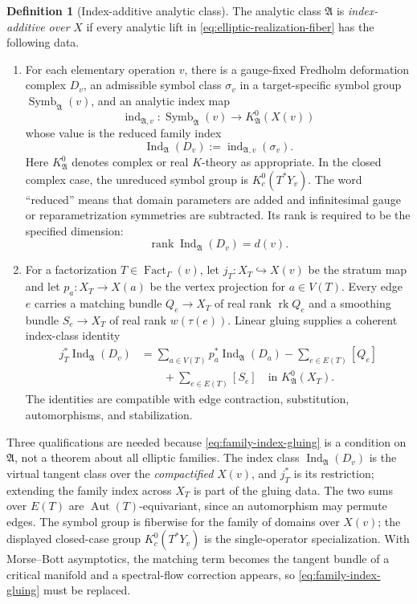 \documentclass[11pt,letterpaper,twoside]{article}
\theoremstyle{plain}
\theoremstyle{definition}
\newtheorem{definition}[theorem]{Definition}
\theoremstyle{remark}
\newcommand{\Ind}{\operatorname{Ind}}
\DeclareMathOperator{\Fact}{Fact}
\begin{document}
\begin{definition}[Index-additive analytic class]\label{def:index-excisive}
The analytic class $\mathfrak A$ is \emph{index-additive over} $X$ if every analytic lift in \eqref{eq:elliptic-realization-fiber} has the following data.
\begin{enumerate}
\item For each elementary operation $v$, there is a gauge-fixed Fredholm deformation complex $D_v$, an admissible symbol class $\sigma_v$ in a target-specific symbol group $\operatorname{Symb}_{\mathfrak A}(v)$, and an analytic index map
\[
 \operatorname{ind}_{\mathfrak A,v}:
 \operatorname{Symb}_{\mathfrak A}(v)
 \longrightarrow K^0_{\mathfrak A}(X(v))
\]
whose value is the reduced family index
\[
 \Ind_{\mathfrak A}(D_v)
 :=\operatorname{ind}_{\mathfrak A,v}(\sigma_v).
\]
Here $K^0_{\mathfrak A}$ denotes complex or real $K$-theory as appropriate.  In the closed complex case, the unreduced symbol group is $K_c^0(T^*Y_v)$.  The word ``reduced'' means that domain parameters are added and infinitesimal gauge or reparametrization symmetries are subtracted.  Its rank is required to be the specified dimension:
\[
 \operatorname{rank}\Ind_{\mathfrak A}(D_v)=d(v).
\]
\item For a factorization $T\in\Fact_\Gamma(v)$, let $j_T:X_T\hookrightarrow X(v)$ be the stratum map and let $p_a:X_T\to X(a)$ be the vertex projection for $a\in V(T)$.  Every edge $e$ carries a matching bundle $Q_e\to X_T$ of real rank $\operatorname{rk}Q_e$ and a smoothing bundle $S_e\to X_T$ of real rank $w(\tau(e))$.  Linear gluing supplies a coherent index-class identity
\begin{equation}\label{eq:family-index-gluing}
\begin{aligned}
 j_T^*\Ind_{\mathfrak A}(D_v)
 &={}
 \sum_{a\in V(T)}p_a^*\Ind_{\mathfrak A}(D_a)
 -\sum_{e\in E(T)}[Q_e]\\
 &\hspace{2em}{}
 +\sum_{e\in E(T)}[S_e]
 \quad\text{in }K^0_{\mathfrak A}(X_T).
\end{aligned}
\end{equation}
The identities are compatible with edge contraction, substitution, automorphisms, and stabilization.
\end{enumerate}
\end{definition}

Three qualifications are needed because \eqref{eq:family-index-gluing} is a condition on \(\mathfrak A\), not a theorem about all elliptic families.  The index class \(\Ind_{\mathfrak A}(D_v)\) is the virtual tangent class over the \emph{compactified} \(X(v)\), and \(j_T^*\) is its restriction; extending the family index across \(X_T\) is part of the gluing data.  The two sums over \(E(T)\) are \(\operatorname{Aut}(T)\)-equivariant, since an automorphism may permute edges.  The symbol group is fiberwise for the family of domains over \(X(v)\); the displayed closed-case group \(K_c^0(T^*Y_v)\) is the single-operator specialization.  With Morse--Bott asymptotics, the matching term becomes the tangent bundle of a critical manifold and a spectral-flow correction appears, so \eqref{eq:family-index-gluing} must be replaced.
\end{document}
